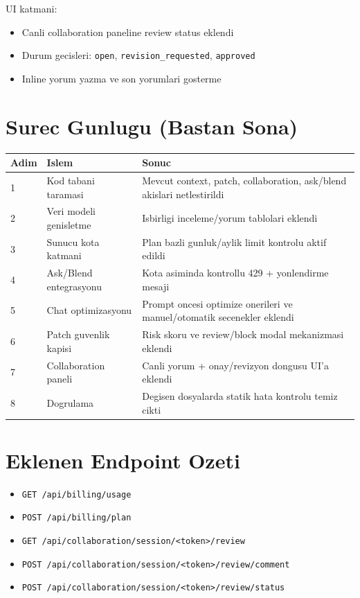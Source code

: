 \documentclass[12pt,a4paper]{article}
\begin{document}
UI katmani:
\begin{itemize}[leftmargin=*]
  \item Canli collaboration paneline review status eklendi
  \item Durum gecisleri: \texttt{open}, \texttt{revision\_requested}, \texttt{approved}
  \item Inline yorum yazma ve son yorumlari gosterme
\end{itemize}

\section{Surec Gunlugu (Bastan Sona)}
\begin{longtable}{@{} P{1.3cm} P{4.2cm} P{7.2cm} @{} }
\toprule
Adim & Islem & Sonuc \\
 & Kod tabani taramasi & Mevcut context, patch, collaboration, ask/blend akislari netlestirildi \\
2 & Veri modeli genisletme & Isbirligi inceleme/yorum tablolari eklendi \\
3 & Sunucu kota katmani & Plan bazli gunluk/aylik limit kontrolu aktif edildi \\
4 & Ask/Blend entegrasyonu & Kota asiminda kontrollu 429 + yonlendirme mesaji \\
5 & Chat optimizasyonu & Prompt oncesi optimize onerileri ve manuel/otomatik secenekler eklendi \\
6 & Patch guvenlik kapisi & Risk skoru ve review/block modal mekanizmasi eklendi \\
7 & Collaboration paneli & Canli yorum + onay/revizyon dongusu UI'a eklendi \\
8 & Dogrulama & Degisen dosyalarda statik hata kontrolu temiz cikti \\
\bottomrule
\end{longtable}

\section{Eklenen Endpoint Ozeti}
\begin{itemize}[leftmargin=*]
  \item \texttt{GET /api/billing/usage}
  \item \texttt{POST /api/billing/plan}
  \item \texttt{GET /api/collaboration/session/<token>/review}
  \item \texttt{POST /api/collaboration/session/<token>/review/comment}
  \item \texttt{POST /api/collaboration/session/<token>/review/status}
\end{itemize}
\end{document}
